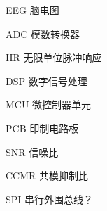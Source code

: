% 
%
%
% 
%
\begin{denotation}
        \item[EEG]    脑电图
        \item[ADC]    模数转换器
        \item[IIR]    无限单位脉冲响应
        \item[DSP]    数字信号处理
        \item[MCU]    微控制器单元
        \item[PCB]    印制电路板
        \item[SNR]    信噪比
        \item[CCMR]   共模抑制比
        \item[SPI]    串行外围总线？
\end{denotation}
